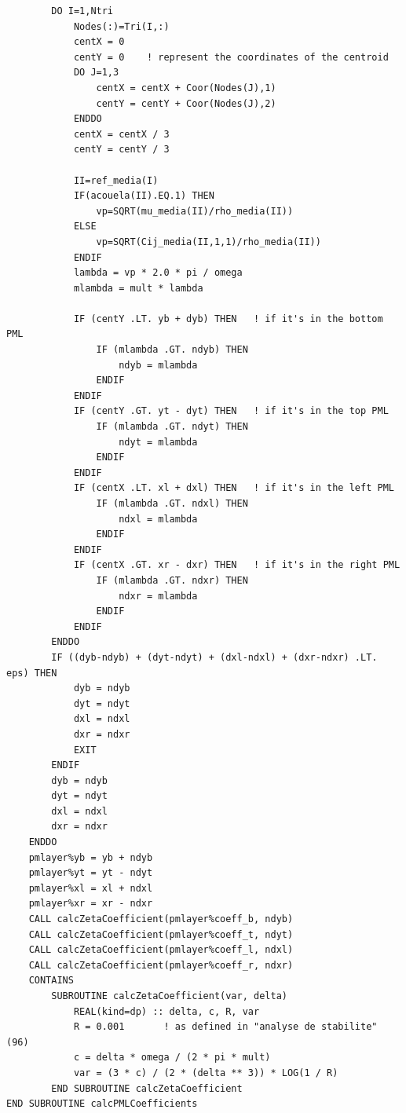 \begin{lstlisting}
        DO I=1,Ntri
            Nodes(:)=Tri(I,:)
            centX = 0
            centY = 0    ! represent the coordinates of the centroid
            DO J=1,3
                centX = centX + Coor(Nodes(J),1)
                centY = centY + Coor(Nodes(J),2)
            ENDDO
            centX = centX / 3
            centY = centY / 3

            II=ref_media(I)
            IF(acouela(II).EQ.1) THEN
                vp=SQRT(mu_media(II)/rho_media(II))
            ELSE
                vp=SQRT(Cij_media(II,1,1)/rho_media(II))
            ENDIF
            lambda = vp * 2.0 * pi / omega
            mlambda = mult * lambda

            IF (centY .LT. yb + dyb) THEN   ! if it's in the bottom PML
                IF (mlambda .GT. ndyb) THEN
                    ndyb = mlambda
                ENDIF
            ENDIF
            IF (centY .GT. yt - dyt) THEN   ! if it's in the top PML
                IF (mlambda .GT. ndyt) THEN
                    ndyt = mlambda
                ENDIF
            ENDIF
            IF (centX .LT. xl + dxl) THEN   ! if it's in the left PML
                IF (mlambda .GT. ndxl) THEN
                    ndxl = mlambda
                ENDIF
            ENDIF
            IF (centX .GT. xr - dxr) THEN   ! if it's in the right PML
                IF (mlambda .GT. ndxr) THEN
                    ndxr = mlambda
                ENDIF
            ENDIF
        ENDDO
        IF ((dyb-ndyb) + (dyt-ndyt) + (dxl-ndxl) + (dxr-ndxr) .LT. eps) THEN
            dyb = ndyb
            dyt = ndyt
            dxl = ndxl
            dxr = ndxr
            EXIT		
        ENDIF
        dyb = ndyb
        dyt = ndyt
        dxl = ndxl
        dxr = ndxr
    ENDDO
    pmlayer%yb = yb + ndyb
    pmlayer%yt = yt - ndyt
    pmlayer%xl = xl + ndxl
    pmlayer%xr = xr - ndxr
    CALL calcZetaCoefficient(pmlayer%coeff_b, ndyb)
    CALL calcZetaCoefficient(pmlayer%coeff_t, ndyt)
    CALL calcZetaCoefficient(pmlayer%coeff_l, ndxl)
    CALL calcZetaCoefficient(pmlayer%coeff_r, ndxr)
    CONTAINS
        SUBROUTINE calcZetaCoefficient(var, delta)
            REAL(kind=dp) :: delta, c, R, var
            R = 0.001       ! as defined in "analyse de stabilite" (96)
            c = delta * omega / (2 * pi * mult)
            var = (3 * c) / (2 * (delta ** 3)) * LOG(1 / R)
        END SUBROUTINE calcZetaCoefficient
END SUBROUTINE calcPMLCoefficients
\end{lstlisting}

